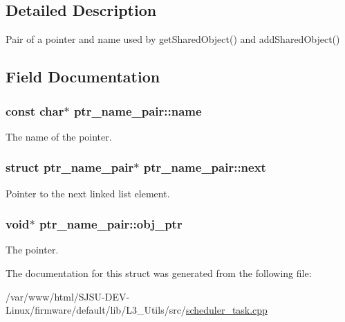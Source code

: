 \subsection{Detailed Description}
Pair of a pointer and name used by get\+Shared\+Object() and add\+Shared\+Object() 

\subsection{Field Documentation}
\subsubsection[{\texorpdfstring{name}{name}}]{\setlength{\rightskip}{0pt plus 5cm}const char$\ast$ ptr\+\_\+name\+\_\+pair\+::name}\hypertarget{structptr__name__pair_a47da823cca98aa11557f7e3261536b56}{}\label{structptr__name__pair_a47da823cca98aa11557f7e3261536b56}


The name of the pointer. 

\subsubsection[{\texorpdfstring{next}{next}}]{\setlength{\rightskip}{0pt plus 5cm}struct {\bf ptr\+\_\+name\+\_\+pair}$\ast$ ptr\+\_\+name\+\_\+pair\+::next}\hypertarget{structptr__name__pair_ae674297b408f0e9ad0c39085eee41b25}{}\label{structptr__name__pair_ae674297b408f0e9ad0c39085eee41b25}


Pointer to the next linked list element. 

\subsubsection[{\texorpdfstring{obj\+\_\+ptr}{obj_ptr}}]{\setlength{\rightskip}{0pt plus 5cm}void$\ast$ ptr\+\_\+name\+\_\+pair\+::obj\+\_\+ptr}\hypertarget{structptr__name__pair_a01311f316e1b65593bd8f922651ea1d5}{}\label{structptr__name__pair_a01311f316e1b65593bd8f922651ea1d5}


The pointer. 



The documentation for this struct was generated from the following file\+:\begin{DoxyCompactItemize}
\item 
/var/www/html/\+S\+J\+S\+U-\/\+D\+E\+V-\/\+Linux/firmware/default/lib/\+L3\+\_\+\+Utils/src/\hyperlink{scheduler__task_8cpp}{scheduler\+\_\+task.\+cpp}\end{DoxyCompactItemize}

